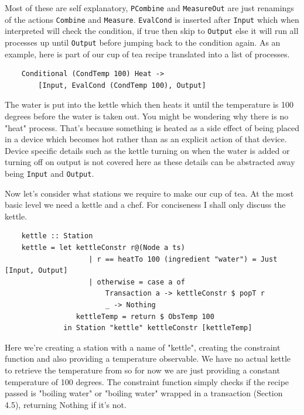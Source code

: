 \documentclass[11pt]{article}
\begin{document}
Most of these are self explanatory, \texttt{PCombine} and \texttt{MeasureOut} are just renamings of
the actions \texttt{Combine} and \texttt{Measure}. \texttt{EvalCond} is inserted after \texttt{Input}
which when interpreted will check the condition, if true then skip to \texttt{Output} else it will
run all processes up until \texttt{Output} before jumping back to the condition again. As an example,
here is part of our cup of tea recipe translated into a list of processes.

\begin{lstlisting}
    Conditional (CondTemp 100) Heat ->
        [Input, EvalCond (CondTemp 100), Output]
\end{lstlisting}

The water is put into the kettle which then heats it until the temperature is 100 degrees
before the water is taken out. You might be wondering why there is no "heat" process.
That's because something is heated as a side effect of being placed in a device which becomes hot
rather than as an explicit action of that device. Device specific details such as the kettle turning
on when the water is added or turning off on output is not covered here as these details can
be abstracted away being \texttt{Input} and \texttt{Output}.

\medbreak

Now let's consider what stations we require to make our cup of tea. At the most basic level
we need a kettle and a chef. For conciseness I shall only discuss the kettle.

\begin{lstlisting}
    kettle :: Station
    kettle = let kettleConstr r@(Node a ts)
                    | r == heatTo 100 (ingredient "water") = Just [Input, Output]
                    | otherwise = case a of
                        Transaction a -> kettleConstr $ popT r
                        _ -> Nothing
                 kettleTemp = return $ ObsTemp 100
              in Station "kettle" kettleConstr [kettleTemp]
\end{lstlisting}

Here we're creating a station with a name of "kettle", creating the constraint function
and also providing a temperature observable. We have no actual kettle to retrieve the temperature
from so for now we are just providing a constant temperature of 100 degrees. The constraint function
simply checks if the recipe passed is "boiling water" or "boiling water" wrapped in a transaction (Section 4.5),
returning Nothing if it's not.
\end{document}
